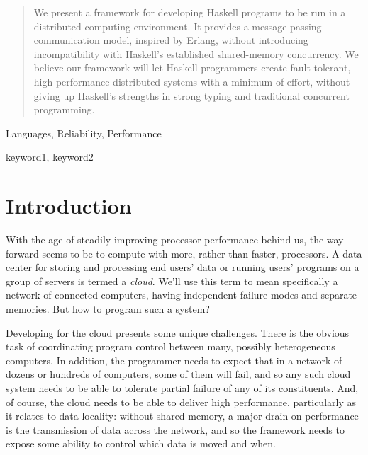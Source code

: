 \documentclass[preprint]{sigplanconf}
\begin{document}
\maketitle

\begin{abstract}
We present a framework for developing Haskell programs to be run in a distributed computing environment. It provides a message-passing communication model, inspired by Erlang, without introducing incompatibility with Haskell's established shared-memory concurrency. We believe our framework will let Haskell programmers create fault-tolerant, high-performance distributed systems with a minimum of effort, without giving up Haskell's strengths in strong typing and traditional concurrent programming.

\end{abstract}


\terms
Languages, Reliability, Performance

\keywords
keyword1, keyword2

\section{Introduction}

With the age of steadily improving processor performance behind us, the way forward seems to be to compute with more, rather than faster, processors. A data center for storing and processing end users' data or running users' programs on a  group of servers is termed a {\em cloud}. We'll use this term to mean specifically a network of connected computers, having independent failure modes and separate memories. But how to program such a system?

Developing for the cloud presents some unique challenges. There is the obvious task of coordinating program control between many, possibly heterogeneous computers. In addition, the programmer needs to expect that in a network of dozens or hundreds of computers, some of them will fail, and so any such cloud system needs to be able to tolerate partial failure of any of its constituents. And, of course, the cloud needs to be able to deliver high performance, particularly as it relates to data locality: without shared memory, a major drain on performance is the transmission of data across the network, and so the framework needs to expose some ability to control which data is moved and when.
\end{document}
